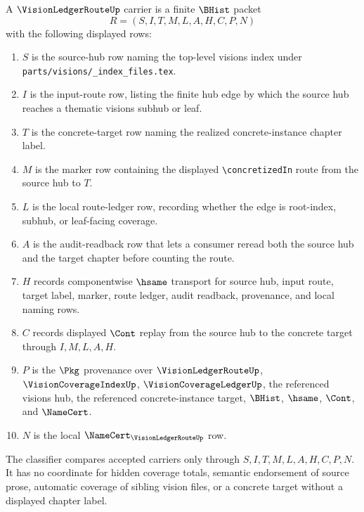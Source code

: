 \begin{definition}
\label{def:vision-ledger-route-carrier}
A $\VisionLedgerRouteUp$ carrier is a finite $\BHist$ packet
$$
R=(S,I,T,M,L,A,H,C,P,N)
$$
with the following displayed rows:
\begin{enumerate}
\item $S$ is the source-hub row naming the top-level visions index under \texttt{parts/visions/\_index\_files.tex}.
\item $I$ is the input-route row, listing the finite hub edge by which the source hub reaches a thematic visions subhub or leaf.
\item $T$ is the concrete-target row naming the realized concrete-instance chapter label.
\item $M$ is the marker row containing the displayed \texttt{\textbackslash concretizedIn} route from the source hub to $T$.
\item $L$ is the local route-ledger row, recording whether the edge is root-index, subhub, or leaf-facing coverage.
\item $A$ is the audit-readback row that lets a consumer reread both the source hub and the target chapter before counting the route.
\item $H$ records componentwise $\hsame$ transport for source hub, input route, target label, marker, route ledger, audit readback, provenance, and local naming rows.
\item $C$ records displayed $\Cont$ replay from the source hub to the concrete target through $I,M,L,A,H$.
\item $P$ is the $\Pkg$ provenance over $\VisionLedgerRouteUp$, $\VisionCoverageIndexUp$, $\VisionCoverageLedgerUp$, the referenced visions hub, the referenced concrete-instance target, $\BHist$, $\hsame$, $\Cont$, and $\NameCert$.
\item $N$ is the local $\NameCert_{\VisionLedgerRouteUp}$ row.
\end{enumerate}
The classifier compares accepted carriers only through $S,I,T,M,L,A,H,C,P,N$. It has no coordinate for hidden coverage totals, semantic endorsement of source prose, automatic coverage of sibling vision files, or a concrete target without a displayed chapter label.
\end{definition}

